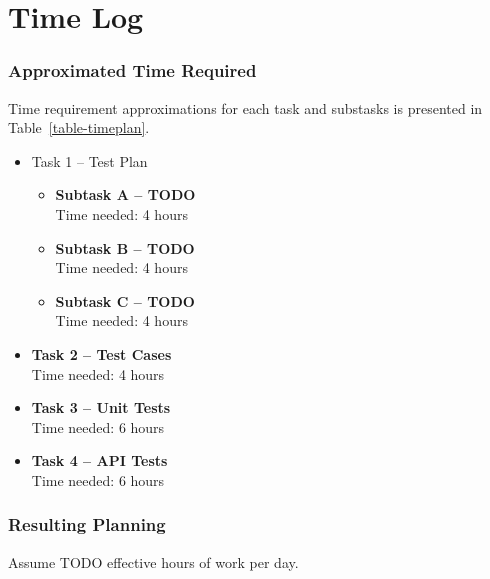 %
%
%
%


\section{Time Log}\label{time-log}


\subsubsection{Approximated Time Required}\label{approximated-time-required}
Time requirement approximations for each task and substasks is presented 
in Table~\ref{table-timeplan}.

\begin{itemize}
\item
  Task 1 -- Test Plan

  \begin{itemize}
  \item
    \textbf{Subtask A -- TODO}\\
    Time needed: 4 hours
  \item
    \textbf{Subtask B -- TODO}\\
    Time needed: 4 hours
  \item
    \textbf{Subtask C -- TODO}\\
    Time needed: 4 hours
  \end{itemize}
\item
  \textbf{Task 2 -- Test Cases}\\
  Time needed: 4 hours
\item
  \textbf{Task 3 -- Unit Tests}\\
  Time needed: 6 hours
\item
  \textbf{Task 4 -- API Tests}\\
  Time needed: 6 hours
\end{itemize}

\subsubsection{Resulting Planning}\label{resulting-planning}
Assume TODO effective hours of work per day.

